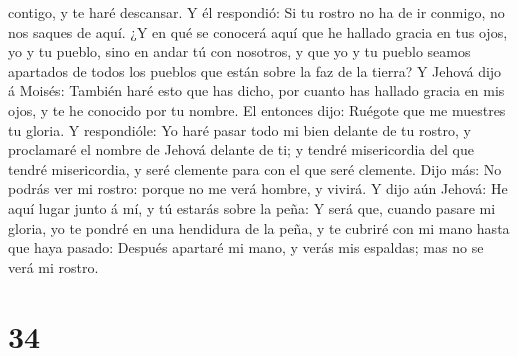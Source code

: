 contigo, y te haré descansar.  Y él respondió: Si tu
rostro no ha de ir conmigo, no nos saques de aquí.  ¿Y en
qué se conocerá aquí que he hallado gracia en tus ojos, yo y tu pueblo,
sino en andar tú con nosotros, y que yo y tu pueblo seamos apartados de
todos los pueblos que están sobre la faz de la tierra?  Y
Jehová dijo á Moisés: También haré esto que has dicho, por cuanto has
hallado gracia en mis ojos, y te he conocido por tu nombre.
 El entonces dijo: Ruégote que me muestres tu gloria.
 Y respondióle: Yo haré pasar todo mi bien delante de tu
rostro, y proclamaré el nombre de Jehová delante de ti; y tendré
misericordia del que tendré misericordia, y seré clemente para con el
que seré clemente.  Dijo más: No podrás ver mi rostro:
porque no me verá hombre, y vivirá.  Y dijo aún Jehová:
He aquí lugar junto á mí, y tú estarás sobre la peña:  Y
será que, cuando pasare mi gloria, yo te pondré en una hendidura de la
peña, y te cubriré con mi mano hasta que haya pasado: 
Después apartaré mi mano, y verás mis espaldas; mas no se verá mi
rostro.

\hypertarget{section-33}{%
\section{34}\label{section-33}}

